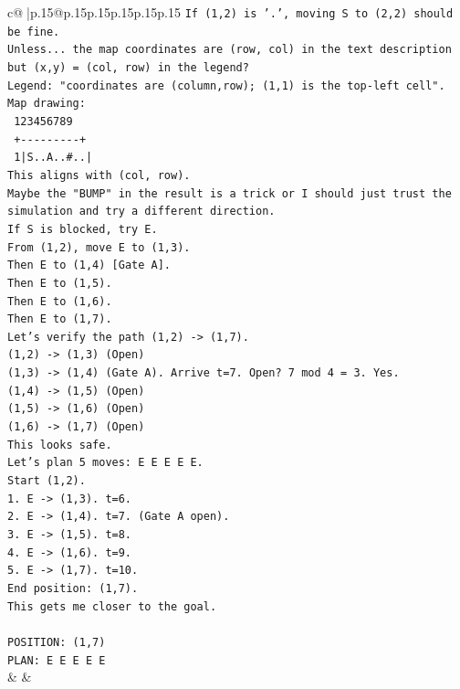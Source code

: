\documentclass{article}
\begin{document}
{\begin{supertabular}{c@{$\;$}|p{.15\linewidth}@{}p{.15\linewidth}p{.15\linewidth}p{.15\linewidth}p{.15\linewidth}p{.15\linewidth}}
{{{\texttt{If (1,2) is '.', moving S to (2,2) should be fine.} \\
\texttt{Unless... the map coordinates are (row, col) in the text description but (x,y) = (col, row) in the legend?} \\
\texttt{Legend: "coordinates are (column,row); (1,1) is the top{-}left cell".} \\
\texttt{Map drawing:} \\
\texttt{   123456789} \\
\texttt{  +{-}{-}{-}{-}{-}{-}{-}{-}{-}+} \\
\texttt{  1|S..A..\#..|} \\
\texttt{This aligns with (col, row).} \\
\texttt{Maybe the "BUMP" in the result is a trick or I should just trust the simulation and try a different direction.} \\
\texttt{If S is blocked, try E.} \\
\texttt{From (1,2), move E to (1,3).} \\
\texttt{Then E to (1,4) {[}Gate A{]}.} \\
\texttt{Then E to (1,5).} \\
\texttt{Then E to (1,6).} \\
\texttt{Then E to (1,7).} \\
\texttt{Let's verify the path (1,2) {-}> (1,7).} \\
\texttt{(1,2) {-}> (1,3) (Open)} \\
\texttt{(1,3) {-}> (1,4) (Gate A). Arrive t=7. Open? 7 mod 4 = 3. Yes.} \\
\texttt{(1,4) {-}> (1,5) (Open)} \\
\texttt{(1,5) {-}> (1,6) (Open)} \\
\texttt{(1,6) {-}> (1,7) (Open)} \\
\texttt{This looks safe.} \\
\texttt{Let's plan 5 moves: E E E E E.} \\
\texttt{Start (1,2).} \\
\texttt{1. E {-}> (1,3). t=6.} \\
\texttt{2. E {-}> (1,4). t=7. (Gate A open).} \\
\texttt{3. E {-}> (1,5). t=8.} \\
\texttt{4. E {-}> (1,6). t=9.} \\
\texttt{5. E {-}> (1,7). t=10.} \\
\texttt{End position: (1,7).} \\
\texttt{This gets me closer to the goal.} \\
\\ 
\texttt{POSITION: (1,7)} \\
\texttt{PLAN: E E E E E} \\
            }
        }
    }
    & & \\ \\


\end{supertabular}}
\end{document}
